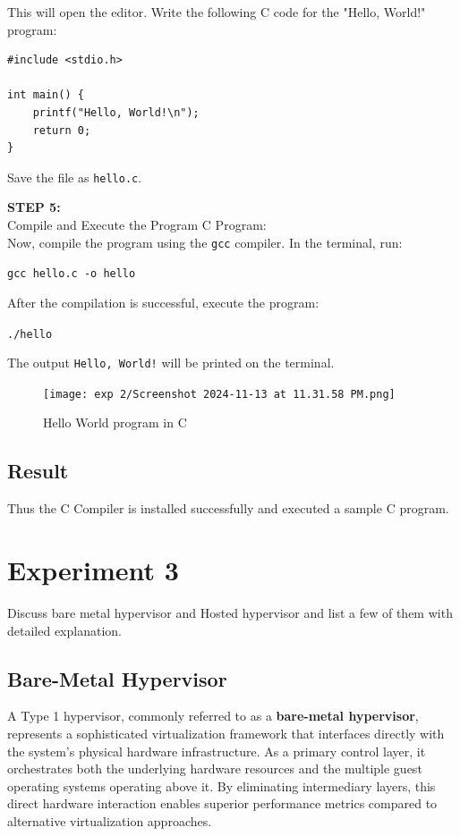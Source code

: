 \documentclass[12pt]{article}
\begin{document}
\begin{spacing}{1.5}
\begin{adjustwidth}{0cm}{0cm}
\begin{justify}
This will open the editor. Write the following C code for the "Hello, World!" program:

\begin{center}
\begin{verbatim}
#include <stdio.h>

int main() {
    printf("Hello, World!\n");
    return 0;
}
\end{verbatim}
\end{center}

Save the file as \texttt{hello.c}.


\textbf{STEP 5:} \\
Compile and Execute the Program C Program: \\
Now, compile the program using the \texttt{gcc} compiler. In the terminal, run:

\begin{center}
\texttt{gcc hello.c -o hello}
\end{center}

After the compilation is successful, execute the program:

\begin{center}
\texttt{./hello}
\end{center}

The output \texttt{Hello, World!} will be printed on the terminal.


\begin{figure}[H]
    \centering
    \texttt{[image: exp 2/Screenshot 2024-11-13 at 11.31.58 PM.png]}
    \caption{Hello World program in C}
    \label{fig: 1}
\end{figure}




\subsection{Result}
Thus the C Compiler is installed successfully and executed a sample C program.




\newpage

\section{Experiment 3}
Discuss bare metal hypervisor and Hosted hypervisor and list a few of them with detailed
explanation.
\subsection{Bare-Metal Hypervisor}
A Type 1 hypervisor, commonly referred to as a \textbf{bare-metal hypervisor}, represents a sophisticated virtualization framework that interfaces directly with the system's physical hardware infrastructure. As a primary control layer, it orchestrates both the underlying hardware resources and the multiple guest operating systems operating above it. By eliminating intermediary layers, this direct hardware interaction enables superior performance metrics compared to alternative virtualization approaches.


\end{justify}
\end{adjustwidth}
\end{spacing}
\end{document}

